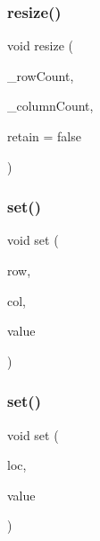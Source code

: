 \mbox{\label{classGrid_aa8036710a8d91046066eacbb8548b6fc}} 
\subsubsection{\texorpdfstring{resize()}{resize()}}
{\footnotesize\ttfamily void resize (\begin{DoxyParamCaption}\item[{int}]{\+\_\+row\+Count,  }\item[{int}]{\+\_\+column\+Count,  }\item[{bool}]{retain = {\ttfamily false} }\end{DoxyParamCaption})}

\mbox{\label{classGrid_a6f5cee26d171f36d280a15c51332efc2}} 
\subsubsection{\texorpdfstring{set()}{set()}\hspace{0.1cm}{\footnotesize\ttfamily [1/2]}}
{\footnotesize\ttfamily void set (\begin{DoxyParamCaption}\item[{int}]{row,  }\item[{int}]{col,  }\item[{const Value\+Type \&}]{value }\end{DoxyParamCaption})}

\mbox{\label{classGrid_a02a61287a9aee6a1ff7e8a8325ce094d}} 
\subsubsection{\texorpdfstring{set()}{set()}\hspace{0.1cm}{\footnotesize\ttfamily [2/2]}}
{\footnotesize\ttfamily void set (\begin{DoxyParamCaption}\item[{const \mbox{\hyperlink{structGridLocation}{Grid\+Location}} \&}]{loc,  }\item[{const Value\+Type \&}]{value }\end{DoxyParamCaption})}

\mbox{\label{classGrid_af9593d4a5ff4274efaf429cb4f9e57cc}} 
